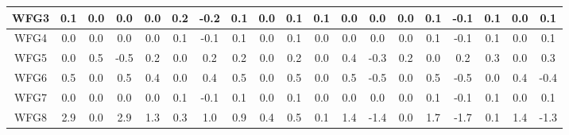 \begin{table}[t]
\begin{tabular}{c|c|c|c|c|c|c|c|c|c|ccccccccc}
\multicolumn{1}{|c|}{WFG3}  & 0.1          & 0.0          & 0.0   & 0.0          & 0.2          & -0.2  & 0.1          & 0.0          & 0.1   & \multicolumn{1}{c|}{0.1}          & \multicolumn{1}{c|}{0.0}          & \multicolumn{1}{c|}{0.0}   & \multicolumn{1}{c|}{0.0}          & \multicolumn{1}{c|}{0.1}          & \multicolumn{1}{c|}{-0.1}  & \multicolumn{1}{c|}{0.1}          & \multicolumn{1}{c|}{0.0}          & \multicolumn{1}{c|}{0.1}   \\ \hline
\multicolumn{1}{|c|}{WFG4}  & 0.0          & 0.0          & 0.0   & 0.0          & 0.1          & -0.1  & 0.1          & 0.0          & 0.1   & \multicolumn{1}{c|}{0.0}          & \multicolumn{1}{c|}{0.0}          & \multicolumn{1}{c|}{0.0}   & \multicolumn{1}{c|}{0.0}          & \multicolumn{1}{c|}{0.1}          & \multicolumn{1}{c|}{-0.1}  & \multicolumn{1}{c|}{0.1}          & \multicolumn{1}{c|}{0.0}          & \multicolumn{1}{c|}{0.1}   \\ \hline
\multicolumn{1}{|c|}{WFG5}  & 0.0          & 0.5          & -0.5  & 0.2          & 0.0          & 0.2   & 0.2          & 0.0          & 0.2   & \multicolumn{1}{c|}{0.0}          & \multicolumn{1}{c|}{0.4}          & \multicolumn{1}{c|}{-0.3}  & \multicolumn{1}{c|}{0.2}          & \multicolumn{1}{c|}{0.0}          & \multicolumn{1}{c|}{0.2}   & \multicolumn{1}{c|}{0.3}          & \multicolumn{1}{c|}{0.0}          & \multicolumn{1}{c|}{0.3}   \\ \hline
\multicolumn{1}{|c|}{WFG6}  & 0.5          & 0.0          & 0.5   & 0.4          & 0.0          & 0.4   & 0.5          & 0.0          & 0.5   & \multicolumn{1}{c|}{0.0}          & \multicolumn{1}{c|}{0.5}          & \multicolumn{1}{c|}{-0.5}  & \multicolumn{1}{c|}{0.0}          & \multicolumn{1}{c|}{0.5}          & \multicolumn{1}{c|}{-0.5}  & \multicolumn{1}{c|}{0.0}          & \multicolumn{1}{c|}{0.4}          & \multicolumn{1}{c|}{-0.4}  \\ \hline
\multicolumn{1}{|c|}{WFG7}  & 0.0          & 0.0          & 0.0   & 0.0          & 0.1          & -0.1  & 0.1          & 0.0          & 0.1   & \multicolumn{1}{c|}{0.0}          & \multicolumn{1}{c|}{0.0}          & \multicolumn{1}{c|}{0.0}   & \multicolumn{1}{c|}{0.0}          & \multicolumn{1}{c|}{0.1}          & \multicolumn{1}{c|}{-0.1}  & \multicolumn{1}{c|}{0.1}          & \multicolumn{1}{c|}{0.0}          & \multicolumn{1}{c|}{0.1}   \\ \hline
\multicolumn{1}{|c|}{WFG8}  & 2.9          & 0.0          & 2.9   & 1.3          & 0.3          & 1.0   & 0.9          & 0.4          & 0.5   & \multicolumn{1}{c|}{0.1}          & \multicolumn{1}{c|}{1.4}          & \multicolumn{1}{c|}{-1.4}  & \multicolumn{1}{c|}{0.0}          & \multicolumn{1}{c|}{1.7}          & \multicolumn{1}{c|}{-1.7}  & \multicolumn{1}{c|}{0.1}          & \multicolumn{1}{c|}{1.4}          & \multicolumn{1}{c|}{-1.3}  \\ \hline

\end{tabular}
\end{table}
